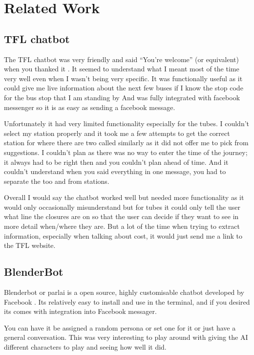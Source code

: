\documentclass[11pt]{article}
\begin{document}
	\section{Related Work} \label {RelatedWork}
		
	\subsection{TFL chatbot}
	The TFL chatbot was very friendly and said “You're welcome” (or equivalent) when you thanked it \citet{TflTravelBot}. It seemed to understand what I meant most of the time very well even when I wasn't being very specific. It was functionally useful as it could give me live information about the next few buses if I know the stop code for the bus stop that I am standing by And was fully integrated with facebook messenger so it is as easy as sending a facebook message.
	
	Unfortunately it had very limited functionality especially for the tubes. I couldn't select my station properly and it took me a few attempts to get the correct station for where there are two called similarly as it did not offer me to pick from suggestions. I couldn't plan as there was no way to enter the time of the journey; it always had to be right then and you couldn't plan ahead of time. And it couldn't understand when you said everything in one message, you had to separate the too and from stations.
	
	Overall I would say the chatbot worked well but needed more functionality as it would only occasionally misunderstand but for tubes it could only tell the user what line the closures are on so that the user can decide if they want to see in more detail when/where they are. 
	But a lot of the time when trying to extract information, especially when talking about cost, it would just send me a link to the TFL website. 
	
	\subsection{BlenderBot}
	Blenderbot or parlai is a open source, highly customisable chatbot developed by Facebook \citet{roller2020recipes}. Its relatively easy to install and use in the terminal, and if you desired its comes with integration into Facebook messager. 
	
	You can have it be assigned a random persona or set one for it or just have a general conversation. This was very interesting to play around with giving the AI different characters to play and seeing how well it did. 
	
\end{document}
